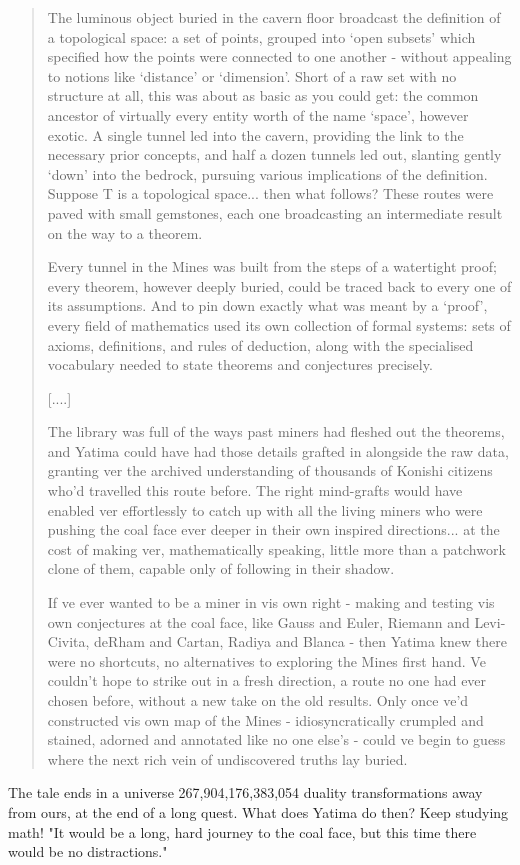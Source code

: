 \begin{quote}
  The luminous object buried in the cavern floor broadcast the
  definition of a topological space: a set of points, grouped into
  `open subsets' which specified how the points were connected to
  one another - without appealing to notions like `distance' or
  `dimension'.  Short of a raw set with no structure at all, this was
  about as basic as you could get: the common ancestor of virtually every
  entity worth of the name `space', however exotic.  A single tunnel led
  into the cavern, providing the link to the necessary prior concepts, and
  half a dozen tunnels led out, slanting gently `down' into the bedrock,
  pursuing various implications of the definition.  Suppose T is a
  topological space... then what follows?  These routes were paved with
  small gemstones, each one broadcasting an intermediate result on the way
  to a theorem.  

  Every tunnel in the Mines was built from the steps of a watertight
  proof; every theorem, however deeply buried, could be traced back to
  every one of its assumptions.  And to pin down exactly what was meant by
  a `proof', every field of mathematics used its own collection of formal
  systems: sets of axioms, definitions, and rules of deduction, along with
  the specialised vocabulary needed to state theorems and conjectures
  precisely.  

  [....]

  The library was full of the ways past miners had fleshed out the
  theorems, and Yatima could have had those details grafted in alongside
  the raw data, granting ver the archived understanding of thousands of
  Konishi citizens who'd travelled this route before.  The right
  mind-grafts would have enabled ver effortlessly to catch up with all
  the living miners who were pushing the coal face ever deeper in their
  own inspired directions... at the cost of making ver, mathematically
  speaking, little more than a patchwork clone of them, capable only of
  following in their shadow. 

  If ve ever wanted to be a miner in vis own right - making and testing
  vis own conjectures at the coal face, like Gauss and Euler, Riemann and
  Levi-Civita, deRham and Cartan, Radiya and Blanca - then Yatima knew
  there were no shortcuts, no alternatives to exploring the Mines first
  hand.  Ve couldn't hope to strike out in a fresh direction, a route no
  one had ever chosen before, without a new take on the old results.  Only
  once ve'd constructed vis own map of the Mines - idiosyncratically
  crumpled and stained, adorned and annotated like no one else's - could
  ve begin to guess where the next rich vein of undiscovered truths lay
  buried.  
\end{quote}
The tale ends in a universe 267,904,176,383,054 duality transformations 
away from ours, at the end of a long quest.  What does Yatima do then?
Keep studying math!  "It would be a long, hard journey to the coal face,
but this time there would be no distractions."

